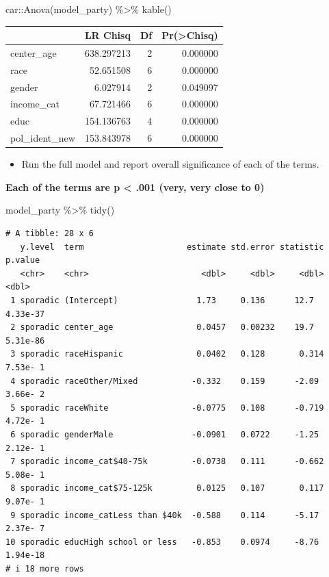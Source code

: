 \documentclass[
  letterpaper,
  DIV=11,
  numbers=noendperiod]{scrartcl}
\newenvironment{Shaded}{\begin{snugshade}}{\end{snugshade}}
\newcommand{\FunctionTok}[1]{\textcolor[rgb]{0.28,0.35,0.67}{#1}}
\newcommand{\NormalTok}[1]{\textcolor[rgb]{0.00,0.23,0.31}{#1}}
\newcommand{\SpecialCharTok}[1]{\textcolor[rgb]{0.37,0.37,0.37}{#1}}
\providecommand{\tightlist}{%
  \setlength{\itemsep}{0pt}\setlength{\parskip}{0pt}}\usepackage{longtable,booktabs,array}
\begin{document}
\begin{Shaded}
\begin{Highlighting}[]
\NormalTok{car}\SpecialCharTok{::}\FunctionTok{Anova}\NormalTok{(model\_party) }\SpecialCharTok{\%\textgreater{}\%} 
  \FunctionTok{kable}\NormalTok{()}
\end{Highlighting}
\end{Shaded}

\begin{longtable}[]{@{}lrrr@{}}
\toprule\noalign{}
& LR Chisq & Df & Pr(\textgreater Chisq) \\
\midrule\noalign{}
\endhead
\bottomrule\noalign{}
\endlastfoot
center\_age & 638.297213 & 2 & 0.000000 \\
race & 52.651508 & 6 & 0.000000 \\
gender & 6.027914 & 2 & 0.049097 \\
income\_cat & 67.721466 & 6 & 0.000000 \\
educ & 154.136763 & 4 & 0.000000 \\
pol\_ident\_new & 153.843978 & 6 & 0.000000 \\
\end{longtable}

\begin{itemize}
\tightlist
\item
  Run the full model and report overall significance of each of the
  terms.
\end{itemize}

\textbf{Each of the terms are p \textless{} .001 (very, very close to
0)}

\begin{Shaded}
\begin{Highlighting}[]
\NormalTok{model\_party }\SpecialCharTok{\%\textgreater{}\%}
  \FunctionTok{tidy}\NormalTok{()}
\end{Highlighting}
\end{Shaded}

\begin{verbatim}
# A tibble: 28 x 6
   y.level  term                     estimate std.error statistic  p.value
   <chr>    <chr>                       <dbl>     <dbl>     <dbl>    <dbl>
 1 sporadic (Intercept)                1.73     0.136      12.7   4.33e-37
 2 sporadic center_age                 0.0457   0.00232    19.7   5.31e-86
 3 sporadic raceHispanic               0.0402   0.128       0.314 7.53e- 1
 4 sporadic raceOther/Mixed           -0.332    0.159      -2.09  3.66e- 2
 5 sporadic raceWhite                 -0.0775   0.108      -0.719 4.72e- 1
 6 sporadic genderMale                -0.0901   0.0722     -1.25  2.12e- 1
 7 sporadic income_cat$40-75k         -0.0738   0.111      -0.662 5.08e- 1
 8 sporadic income_cat$75-125k         0.0125   0.107       0.117 9.07e- 1
 9 sporadic income_catLess than $40k  -0.588    0.114      -5.17  2.37e- 7
10 sporadic educHigh school or less   -0.853    0.0974     -8.76  1.94e-18
# i 18 more rows
\end{verbatim}
\end{document}
